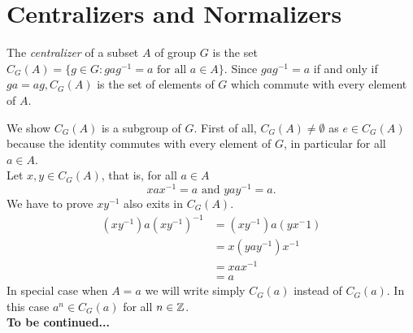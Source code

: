 \section{Centralizers and Normalizers}
\begin{definition}[Centralizer]
    The \textit{centralizer} of a subset $A$ of group $G$ is the set $C_G(A) = \{g \in G : g a g^{-1} = a \text{ for all } a \in A\}$. Since $g a g^{-1} = a$ if and only if $ga = ag, C_G(A)$ is the set of elements of $G$ which commute with every element of $A$.    
\end{definition}
We show $C_G(A)$ is a subgroup of $G$. First of all, $C_G(A) \neq \emptyset$ as $e \in C_G(A)$ because the identity commutes with every element of $G$, in particular for all $a \in A$.\\
Let $x, y \in C_G(A)$, that is, for all $a \in A$
$$
x a x^{-1} = a
\text{ and } 
y a y^{-1} = a.
$$
We have to prove $xy^{-1}$ also exits in $C_G(A)$.
\begin{align*}
    (xy^{-1})  a (xy^{-1})^{-1} &= (xy^{-1})  a (y x^-1)\\
                            &= x (y a y ^{-1}) x^{-1}\\
                            &= x a x^{-1}\\
                            &=a
\end{align*}
In special case when $A = {a}$ we will write simply $C_G(a)$ instead of $C_G({a})$. In this case $a^n \in C_G(a)$ for all $n \in \mathbb{Z}$.\\   
\textbf{To be continued...}